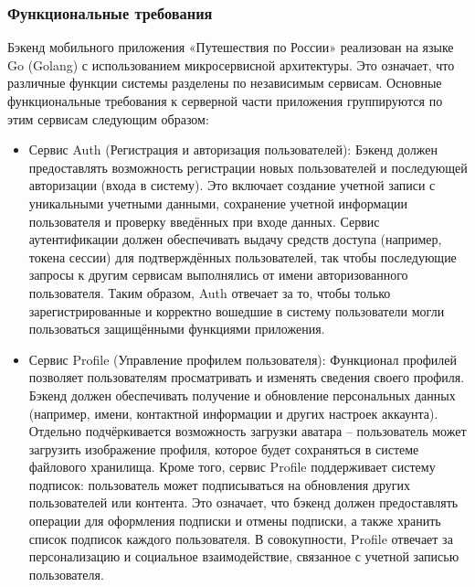 \subsubsection*{Функциональные требования}
Бэкенд мобильного приложения «Путешествия по России» реализован на языке Go (Golang) с использованием микросервисной архитектуры. Это означает, что различные функции системы разделены по независимым сервисам. Основные функциональные требования к серверной части приложения группируются по этим сервисам следующим образом:
\begin{itemize}
    \item Сервис Auth (Регистрация и авторизация пользователей): Бэкенд должен предоставлять возможность регистрации новых пользователей и последующей авторизации (входа в систему). Это включает создание учетной записи с уникальными учетными данными, сохранение учетной информации пользователя и проверку введённых при входе данных. Сервис аутентификации должен обеспечивать выдачу средств доступа (например, токена сессии) для подтверждённых пользователей, так чтобы последующие запросы к другим сервисам выполнялись от имени авторизованного пользователя. Таким образом, Auth отвечает за то, чтобы только зарегистрированные и корректно вошедшие в систему пользователи могли пользоваться защищёнными функциями приложения.
    \item Сервис Profile (Управление профилем пользователя): Функционал профилей позволяет пользователям просматривать и изменять сведения своего профиля. Бэкенд должен обеспечивать получение и обновление персональных данных (например, имени, контактной информации и других настроек аккаунта). Отдельно подчёркивается возможность загрузки аватара – пользователь может загрузить изображение профиля, которое будет сохраняться в системе файлового хранилища. Кроме того, сервис Profile поддерживает систему подписок: пользователь может подписываться на обновления других пользователей или контента. Это означает, что бэкенд должен предоставлять операции для оформления подписки и отмены подписки, а также хранить список подписок каждого пользователя. В совокупности, Profile отвечает за персонализацию и социальное взаимодействие, связанное с учетной записью пользователя.

\end{itemize}
